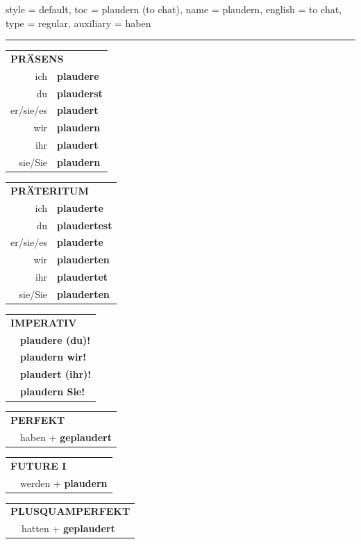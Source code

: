 \begin{verbentry}{
  style = {default},
  toc = {plaudern (to chat)},
  name = {plaudern},
  english = {to chat},
  type = {regular},
  auxiliary = {haben}
}


\vspace{5pt}
\hrule
\vspace{5pt}

\begin{tabular}{rl}
\multicolumn{2}{l}{\textbf{PRÄSENS}}\\
ich & \textbf{plaudere}\\
du & \textbf{plauderst}\\
er/sie/es & \textbf{plaudert}\\
wir & \textbf{plaudern}\\
ihr & \textbf{plaudert}\\
sie/Sie & \textbf{plaudern}\\
\end{tabular}
\hfill
\begin{tabular}{rl}
\multicolumn{2}{l}{\textbf{PRÄTERITUM}}\\
ich & \textbf{plauderte}\\
du & \textbf{plaudertest}\\
er/sie/es & \textbf{plauderte}\\
wir & \textbf{plauderten}\\
ihr & \textbf{plaudertet}\\
sie/Sie & \textbf{plauderten}\\
\end{tabular}
\hfill
\begin{tabular}{rl}
\multicolumn{2}{l}{\textbf{IMPERATIV}}\\
& \textbf{plaudere (du)!}\\
& \textbf{plaudern wir!}\\
& \textbf{plaudert (ihr)!}\\
& \textbf{plaudern Sie!}\\
\end{tabular}

\vspace{10pt}

\begin{tabular}{rl}
\multicolumn{2}{l}{\textbf{PERFEKT}}\\
& haben + \textbf{geplaudert}\\
\end{tabular}
\hfill
\begin{tabular}{rl}
\multicolumn{2}{l}{\textbf{FUTURE I}}\\
& werden + \textbf{plaudern}\\
\end{tabular}
\hfill
\begin{tabular}{rl}
\multicolumn{2}{l}{\textbf{PLUSQUAMPERFEKT}}\\
& hatten + \textbf{geplaudert}\\
\end{tabular}


\end{verbentry}
